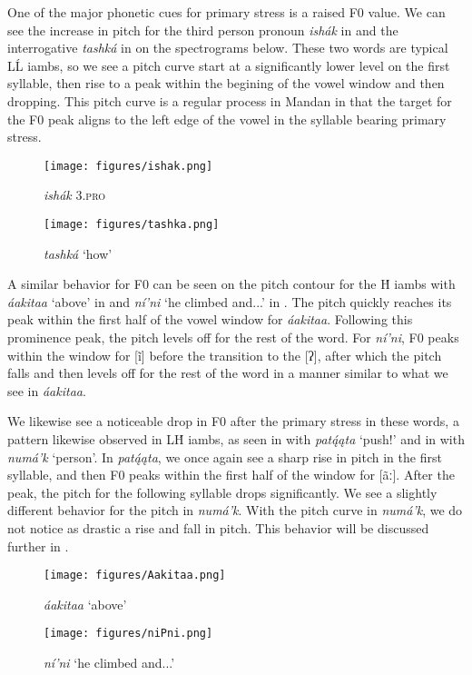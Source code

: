 One of the major phonetic cues for primary stress is a raised F0 value. We can see the increase in pitch for the third person pronoun \textit{ishák} in  and the interrogative \textit{tashká} in  on the spectrograms below. These two words are typical LĹ iambs, so we see a pitch curve start at a significantly lower level on the first syllable, then rise to a peak within the begining of the vowel window and then dropping. This pitch curve is a regular process in Mandan in that the target for the F0 peak aligns to the left edge of the vowel in the syllable bearing primary stress.

\begin{figure}
\caption{\textit{ishák} \textsc{3.pro}}\label{ishak}
\texttt{[image: figures/ishak.png]}
\end{figure}


\begin{figure}
\caption{\textit{tashká} `how'}\label{tashka}
\texttt{[image: figures/tashka.png]}
\end{figure}

A similar behavior for F0 can be seen on the pitch contour for the H́ iambs with \textit{áakitaa} `above' in  and \textit{ní'ni} `he climbed and...' in . The pitch quickly reaches its peak within the first half of the vowel window for \textit{áakitaa}. Following this prominence peak, the pitch levels off for the rest of the word. For \textit{ní'ni}, F0 peaks within the window for [ĩ] before the transition to the [ʔ], after which the pitch falls and then levels off for the rest of the word in a manner similar to what we see in \textit{áakitaa}.

We likewise see a noticeable drop in F0 after the primary stress in these words, a pattern likewise observed in LH́ iambs, as seen in  with \textit{patą́ąta} `push!' and in  with \textit{numá'k} `person'. In \textit{patą́ąta}, we once again see a sharp rise in pitch in the first syllable, and then F0 peaks within the first half of the window for [ãː]. After the peak, the pitch for the following syllable drops significantly. We see a slightly different behavior for the pitch in \textit{numá'k}. With the pitch curve in \textit{numá'k}, we do not notice as drastic a rise and fall in pitch. This behavior will be discussed further in .



\begin{figure}
\caption{\textit{áakitaa} `above'}\label{Aakitaa}
\texttt{[image: figures/Aakitaa.png]}
\end{figure}
\begin{figure}
\caption{\textit{ní'ni} `he climbed and...'}\label{niPni}
\texttt{[image: figures/niPni.png]}
\end{figure}

